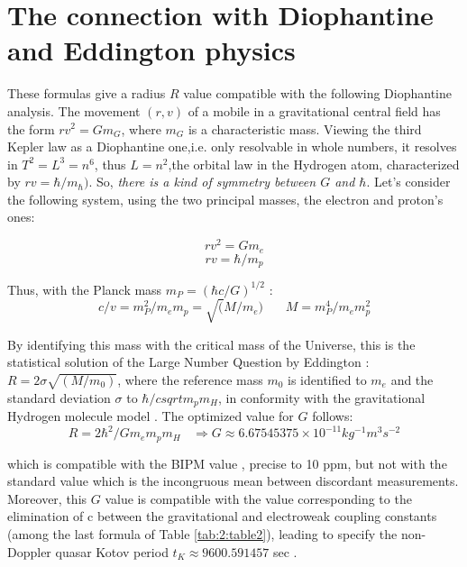 \documentclass[a4paper,9pt]{article}
\begin{document}
    \section{The connection with Diophantine and Eddington physics}

These formulas give a radius $R$ value compatible with the following Diophantine analysis. The movement $(r,v)$ of a mobile in a gravitational central field has the form $r v^2 = Gm_G$, where $m_G$ is a characteristic mass. Viewing the third Kepler law as a Diophantine one,i.e. only resolvable in whole numbers, it resolves in  $T^2 = L^3 = n^6$, thus $L = n^2$,the orbital law in the Hydrogen atom, characterized by $rv = \hbar/m_{\hbar})$. So, \textit{there is a kind of symmetry between $G$ and $\hbar$}. Let's consider the following system, using the two principal masses, the electron and proton's ones: 

\begin{equation}
  r v^2 = Gm_e
  \end{equation}
  \begin{equation}
r v = \hbar/m_p  
\end{equation}

Thus, with the Planck mass $m_P = (\hbar c/G)^{1/2}$ : 
\begin{equation}
c/v = m_P^2/m_em_p = \sqrt(M/m_e)~~~~~~~~   M = m_P^4/m_em_p^2
\end{equation}

By identifying this mass with the critical mass of the Universe, this is the statistical solution \cite{Durham} of the Large Number Question by Eddington  : $R = 2 \sigma \sqrt{(M/m_0)}$, where the reference mass $m_0$ is identified to $m_e$ and the standard deviation $\sigma$ to $\hbar/csqrt{m_pm_H}$, in conformity with the gravitational Hydrogen molecule model \cite{Sanchez}. The optimized value for $G$ follows:
\begin{equation}
R = 2\hbar^2/Gm_em_pm_H  ~~~~  \Rightarrow G \approx 6.67545375 \times 10^{-11}  kg^{-1}m^{3}s^{-2}    
\end{equation}

which is compatible with the BIPM value \cite{Quinn}, precise to 10 ppm, but not with the standard value \cite{Tannabashi} which is the incongruous mean between discordant measurements. Moreover, this $G$ value is compatible with the value corresponding to the elimination of c between the gravitational and electroweak coupling constants (among the last formula of Table \ref{tab:2:table2}), leading to specify the non-Doppler quasar Kotov period $t_K \approx 9600.591457$ sec \cite{Sanchez}.
\end{document}
